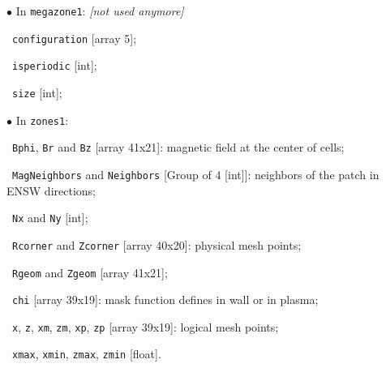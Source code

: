 \documentclass[t,10pt,a3paper]{beamer} %
\begin{document}
\begin{frame}
\begin{columns}
\begin{column}{0.6\textwidth}
\vspace*{0.15cm}
{\color{vert} $\bullet$}  In \verb|megazone1|: \textit{[not used anymore]} \par 
\ \verb|configuration| [array 5]; \par 
\ \verb|isperiodic| [int]; \par 
\ \verb|size| [int]; \par 

\vspace*{0.15cm}

{\color{vert} $\bullet$}  In \verb|zones1|: \par
\ \verb|Bphi|, \verb|Br| and \verb|Bz| [array 41x21]: magnetic field at the center of cells; \par 
\ \verb|MagNeighbors| and \verb|Neighbors| [Group of 4 [int]]: neighbors of the patch in ENSW directions; \par 
\ \verb|Nx| and \verb|Ny| [int]; \par 
\ \verb|Rcorner| and \verb|Zcorner| [array 40x20]: physical mesh points; \par 
\ \verb|Rgeom| and \verb|Zgeom| [array 41x21]; \par 
\ \verb|chi| [array 39x19]: mask function defines in wall or in plasma; \par 
\ \verb|x|, \verb|z|, \verb|xm|, \verb|zm|, \verb|xp|, \verb|zp| [array 39x19]: logical mesh points; \par 
\ \verb|xmax|, \verb|xmin|, \verb|zmax|, \verb|zmin| [float]. \par
\end{column}
\end{columns}


\end{frame}
\end{document}

